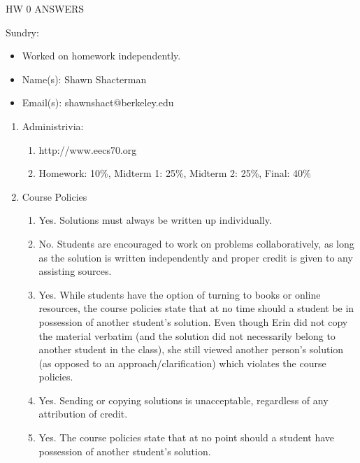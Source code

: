 \documentclass{article}
\begin{document}
	\begin{center}
		\Huge HW 0 ANSWERS
	\end{center}

	\begin{flushleft}
		\huge Sundry: 
	\end{flushleft}

	\begin{itemize}
		\normalsize
		\item Worked on homework independently.
		\item Name(s): Shawn Shacterman
		\item Email(s): shawnshact@berkeley.edu
	\end{itemize}

	\begin{enumerate}
		\huge
		\item Administrivia: 

		\normalsize
		\begin{enumerate}
			\item http://www.eecs70.org
			\item Homework: 10\%, Midterm 1: 25\%, Midterm 2: 25\%, Final: 40\%
		\end{enumerate}

		\huge
		\item Course Policies
	
		\normalsize	
		\begin{enumerate}
			\item Yes. Solutions must always be written up individually.
			\item No. Students are encouraged to work on problems collaboratively, as long as the solution is written independently and proper credit is given to any assisting sources.
			\item Yes. While students have the option of turning to books or online resources, the course policies state that at no time should a student be in possession of another student's solution. Even though Erin did not copy the material verbatim (and the solution did not necessarily belong to another student in the class), she still viewed another person's solution (as opposed to an approach/clarification) which violates the course policies.
			\item Yes. Sending or copying solutions is unacceptable, regardless of any attribution of credit. 
			\item Yes. The course policies state that at no point should a student have possession of another student's solution.  
		\end{enumerate}
	

\end{enumerate}
\end{document}
